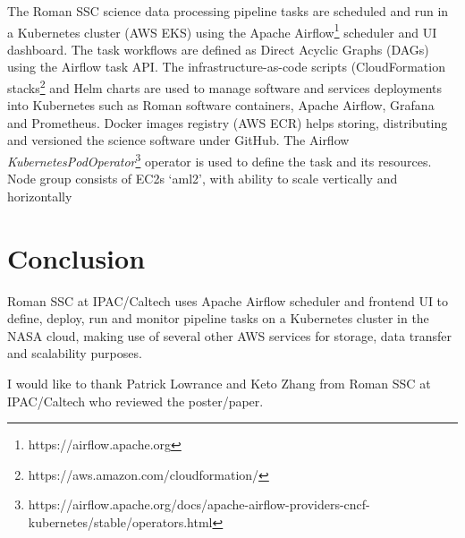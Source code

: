 \documentclass[11pt,twoside]{article}
\begin{document}
The Roman SSC science data processing pipeline tasks are scheduled and run in a Kubernetes cluster (AWS EKS) using the Apache Airflow\footnote{https://airflow.apache.org} scheduler and UI dashboard. The task workflows are defined as Direct Acyclic Graphs (DAGs) using the Airflow task API. The infrastructure-as-code scripts (CloudFormation stacks\footnote{https://aws.amazon.com/cloudformation/} and Helm charts are used to manage software and services deployments into Kubernetes such as Roman software containers, Apache Airflow, Grafana and Prometheus.
Docker images registry (AWS ECR) helps storing, distributing and versioned the science software under GitHub.
The Airflow \emph{KubernetesPodOperator}\footnote{https://airflow.apache.org/docs/apache-airflow-providers-cncf-kubernetes/stable/operators.html} operator is used to define the task and its resources.
Node group consists of EC2s ‘aml2’, with ability to scale vertically and horizontally


\section{Conclusion}

Roman SSC at IPAC/Caltech uses Apache Airflow scheduler and frontend UI to define, deploy, run and monitor pipeline tasks on a Kubernetes cluster in the NASA cloud, making use of several other AWS services for storage, data transfer and scalability purposes.


\acknowledgements I would like to thank Patrick Lowrance and Keto Zhang from Roman SSC at IPAC/Caltech who reviewed the poster/paper.


\end{document}
